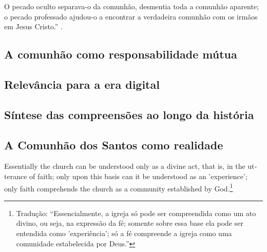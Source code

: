 \begin{citacao}O pecado oculto separava-o da comunhão, desmentia toda a comunhão aparente; o pecado professado ajudou-o a encontrar a verdadeira comunhão com os irmãos em Jesus Cristo.'' \cite[p. 80]{bonhoeffer1997}.
\end{citacao}

\subsection{A comunhão como responsabilidade mútua}

\subsection{Relevância para a era digital}

\subsection{Síntese das compreensões ao longo da história}

\subsection{A Comunhão dos Santos como realidade}

\begin{citacao}
\foreignlanguage{english}{Essentially the church can be understood only as a divine act, that is, in the utterance of faith; only upon this basis can it be understood as an 'experience'; only faith comprehends the church as a community established by God.}\footnote{Tradução: ``Essencialmente, a igreja só pode ser compreendida como um ato divino, ou seja, na expressão da fé; somente sobre essa base ela pode ser entendida como 'experiência'; só a fé compreende a igreja como uma comunidade estabelecida por Deus.''} \cite[p. 195]{bonhoeffer1963}
\end{citacao}
